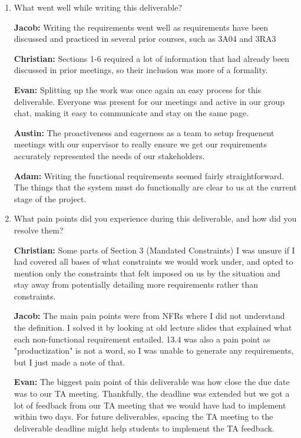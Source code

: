 \documentclass[12pt]{article}
\begin{document}
\begin{enumerate}
  \item What went well while writing this deliverable?
  
  \textbf{Jacob: } Writing the requirements went well as requirements have been discussed and practiced in several prior courses, such as 3A04 and 3RA3

  \textbf{Christian: } Sections 1-6 required a lot of information that had already been discussed in prior meetings, so their inclusion was more of a formality.

  \textbf{Evan: } Splitting up the work was once again an easy process for this deliverable. Everyone was present for our meetings and active in our group chat, making it easy to communicate and stay on the same page.

  \textbf{Austin: } The proactiveness and eagerness as a team to setup frequenent meetings with our supervisor to really ensure we get our requirements accurately represented the needs of our stakeholders.

  \textbf{Adam:} Writing the functional requirements seemed fairly straightforward. The things that the system must do functionally are clear to us at the current stage of the project.

  \item What pain points did you experience during this deliverable, and how did you resolve them?

  \textbf{Christian: } Some parts of Section 3 (Mandated Constraints) I was unsure if I had covered all bases of what constraints we would work under, and opted to mention only the constraints that felt imposed on us by the situation and stay away from potentially detailing more requirements rather than constraints.

  \textbf{Jacob: } The main pain points were from NFRs where I did not understand the definition. I solved it by looking at old lecture slides that explained what each non-functional requirement entailed. 13.4 was also a pain point as "productization" is not a word, so I was unable to generate any requirements, but I just made a note of that.

  \textbf{Evan: } The biggest pain point of this deliverable was how close the due date was to our TA meeting. Thankfully, the deadline was extended but we got a lot of feedback from our TA meeting that we would have had to implement within two days. For future deliverables, spacing the TA meeting to the deliverable deadline might help students to implement the TA feedback.


\end{enumerate}
\end{document}
